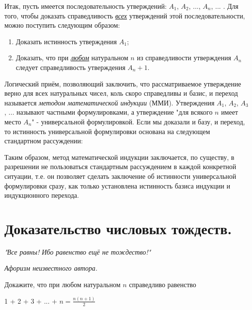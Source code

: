 Итак, пусть имеется последовательность утверждений: $A_1$, $A_2$, $...$, $A_n$, $...$ . Для того, чтобы доказать
справедливость \textit{\underline{всех}} утверждений этой последовательности, можно поступить следующим образом:
\begin{enumerate}
\item Доказать истинность утверждения $A_1$;
\item Доказать, что при \textit{\underline{любом}} натуральном $n$ из справедливости утверждения $A_n$ следует справедливость
утверждения $A_n+1$. 
\end{enumerate}

Логический приём, позволяющий заключить, что рассматриваемое утверждение верно для всех натуральных чисел, коль скоро справедливы и базис, и переход называется \textit{методом математической индукции} (ММИ). Утверждения $A_1$, $A_2$, $A_3$, $...$ называют частными формулировками, а утверждение "для всякого $n$ имеет место $A_n$" - универсальной формулировкой. Если мы доказали и базу, и переход, то истинность универсальной формулировки основана на следующем стандартном рассуждении:


Таким образом, метод математической индукции заключается, по существу, в разрешении не пользоваться стандартным рассуждением в каждой конкретной ситуации, т.е. он позволяет сделать заключение об истинности универсальной формулировки сразу, как только установлена истинность базиса индукции и индукционного перехода.

\section{Доказательство числовых тождеств.}
\epigraph{\textit{"Все равны! Ибо равенство ещё не тождество!"}}{\textit{Афоризм неизвестного автора.}}

\begin{thm}
    Докажите, что при любом натуральном $n$ справедливо равенство 
    \par
    1 + 2 + 3 + ... + $n = \frac{n(n+1)}{2}$
\end{thm}

